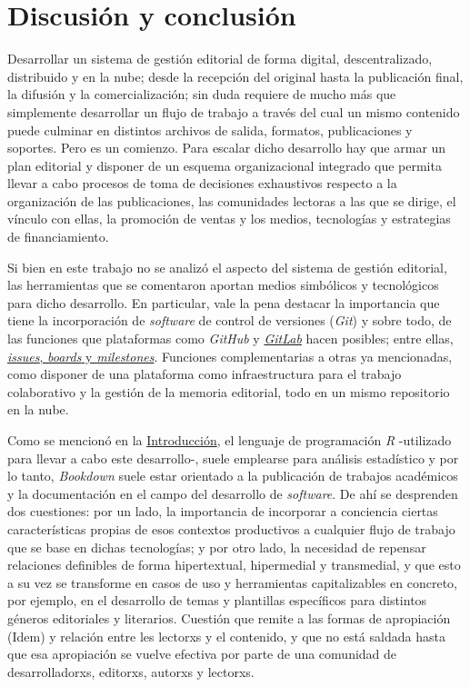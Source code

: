 \documentclass[
]{book}
\begin{document}
\hypertarget{discusiuxf3n-y-conclusiuxf3n}{%
\chapter{Discusión y conclusión}\label{discusiuxf3n-y-conclusiuxf3n}}

Desarrollar un sistema de gestión editorial de forma digital, descentralizado, distribuido y en la nube; desde la recepción del original hasta la publicación final, la difusión y la comercialización; sin duda requiere de mucho más que simplemente desarrollar un flujo de trabajo a través del cual un mismo contenido puede culminar en distintos archivos de salida, formatos, publicaciones y soportes. Pero es un comienzo. Para escalar dicho desarrollo hay que armar un plan editorial y disponer de un esquema organizacional integrado que permita llevar a cabo procesos de toma de decisiones exhaustivos respecto a la organización de las publicaciones, las comunidades lectoras a las que se dirige, el vínculo con ellas, la promoción de ventas y los medios, tecnologías y estrategias de financiamiento.

Si bien en este trabajo no se analizó el aspecto del sistema de gestión editorial, las herramientas que se comentaron aportan medios simbólicos y tecnológicos para dicho desarrollo. En particular, vale la pena destacar la importancia que tiene la incorporación de \emph{software} de control de versiones (\emph{Git}) y sobre todo, de las funciones que plataformas como \emph{GitHub} y \href{https://about.gitlab.com/}{\emph{GitLab}} hacen posibles; entre ellas, \href{https://docs.github.com/en}{\emph{issues}, \emph{boards} y \emph{milestones}}. Funciones complementarias a otras ya mencionadas, como disponer de una plataforma como infraestructura para el trabajo colaborativo y la gestión de la memoria editorial, todo en un mismo repositorio en la nube.

Como se mencionó en la \protect\hyperlink{intro}{Introducción}, el lenguaje de programación \emph{R} -utilizado para llevar a cabo este desarrollo-, suele emplearse para análisis estadístico y por lo tanto, \emph{Bookdown} suele estar orientado a la publicación de trabajos académicos y la documentación en el campo del desarrollo de \emph{software}. De ahí se desprenden dos cuestiones: por un lado, la importancia de incorporar a conciencia ciertas características propias de esos contextos productivos a cualquier flujo de trabajo que se base en dichas tecnologías; y por otro lado, la necesidad de repensar relaciones definibles de forma hipertextual, hipermedial y transmedial, y que esto a su vez se transforme en casos de uso y herramientas capitalizables en concreto, por ejemplo, en el desarrollo de temas y plantillas específicos para distintos géneros editoriales y literarios. Cuestión que remite a las formas de apropiación (Idem) y relación entre les lectorxs y el contenido, y que no está saldada hasta que esa apropiación se vuelve efectiva por parte de una comunidad de desarrolladorxs, editorxs, autorxs y lectorxs.
\end{document}
